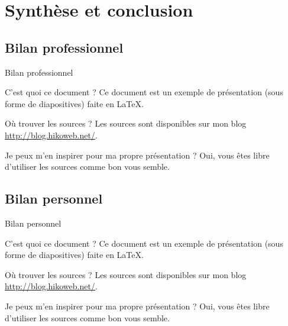 \documentclass[utf8,compress]{beamer}
\begin{document}
\section{Synthèse et conclusion}
\subsection{Bilan professionnel}
\begin{frame}{Bilan professionnel}
\begin{block}{C'est quoi ce document ?}
    Ce document est un exemple de présentation (sous forme de diapositives) faite en LaTeX.
\end{block}
\begin{block}{Où trouver les sources ?}
    Les sources sont disponibles sur mon blog \url{http://blog.hikoweb.net/}.
\end{block}
\begin{block}{Je peux m'en inspirer pour ma propre présentation ?}
    Oui, vous êtes libre d'utiliser les sources comme bon vous semble.
\end{block}
\end{frame}
\subsection{Bilan personnel}
\begin{frame}{Bilan personnel}
\begin{block}{C'est quoi ce document ?}
    Ce document est un exemple de présentation (sous forme de diapositives) faite en LaTeX.
\end{block}
\begin{block}{Où trouver les sources ?}
    Les sources sont disponibles sur mon blog \url{http://blog.hikoweb.net/}.
\end{block}
\begin{block}{Je peux m'en inspirer pour ma propre présentation ?}
    Oui, vous êtes libre d'utiliser les sources comme bon vous semble.
\end{block}
\end{frame}
\end{document}
